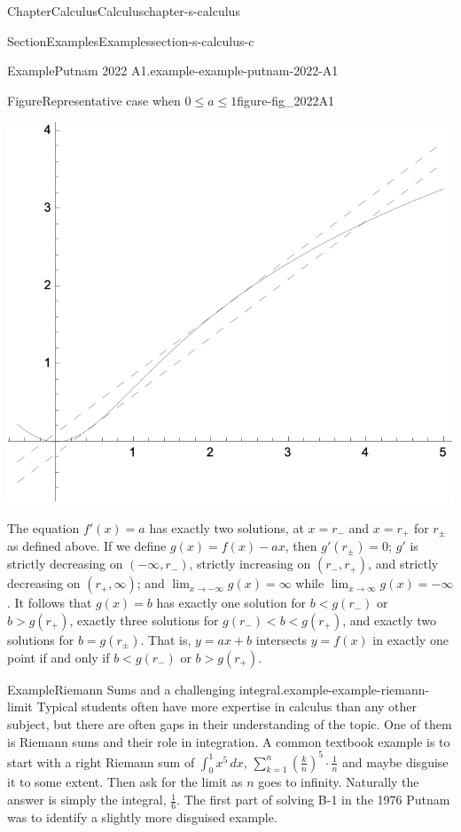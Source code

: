 \documentclass[oneside,10pt,]{book}
\numberwithin{equation}{section}
\newcommand{\lt}{<}
\newcommand{\gt}{>}
\begin{document}
\begin{chapterptx}{Chapter}{Calculus}{}{Calculus}{}{}{chapter-s-calculus}
\begin{sectionptx}{Section}{Examples}{}{Examples}{}{}{section-s-calculus-c}
\begin{example}{Example}{Putnam 2022 A1.}{example-example-putnam-2022-A1}
\begin{figureptx}{Figure}{Representative case when \(0 \leq a \leq 1\)}{figure-fig_2022A1}{}%
\begin{image}{0.2}{0.6}{0.2}{}%
\includegraphics[width=\linewidth]{images/fig_2022A1.png}
\end{image}%
\tcblower
\end{figureptx}%
The equation \(f'(x) = a\) has exactly two solutions, at \(x=r_-\) and \(x=r_+\) for \(r_{\pm}\) as defined above. If we define \(g(x) = f(x)-ax\), then \(g'(r_\pm)=0\); \(g'\) is strictly decreasing on \((-\infty,r_-)\), strictly increasing on \((r_-,r_+)\), and strictly decreasing on \((r_+,\infty)\); and \(\lim_{x\to-\infty} g(x) = \infty\) while \(\lim_{x\to\infty} g(x) = -\infty\). It follows that \(g(x)=b\) has exactly one solution for \(b \lt g(r_-)\) or \(b>g(r_+)\), exactly three solutions for \(g(r_-)\lt b \lt g(r_+)\), and exactly two solutions for \(b = g(r_\pm)\). That is, \(y=ax+b\) intersects \(y=f(x)\) in exactly one point if and only if \(b\lt g(r_-)\) or \(b\gt g(r_+)\).%
\end{example}
\begin{example}{Example}{Riemann Sums and a challenging integral.}{example-example-riemann-limit}%
%
Typical students often have more expertise in calculus than any other subject, but there are often gaps in their understanding of the topic.  One of them is Riemann sums and their role in integration.  A common textbook example is to start with a right Riemann sum of \(\int_0^1 x^5 \, dx\), \(\sum _{k=1}^n \left(\frac{k}{n}\right)^5 \cdot \frac{1}{n}\) and maybe disguise it to some extent.  Then ask for the limit as \(n\) goes to infinity.  Naturally the answer is simply the integral, \(\frac{1}{6}\).   The first part of solving B-1 in the 1976 Putnam was to identify a slightly more disguised example.%

\end{example}
\end{sectionptx}
\end{chapterptx}
\end{document}
